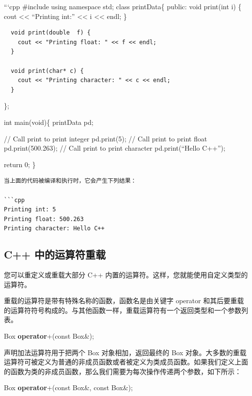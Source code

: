 \documentclass[
]{article}
\newenvironment{Shaded}{}{}
\newcommand{\AttributeTok}[1]{\textcolor[rgb]{0.49,0.56,0.16}{#1}}
\newcommand{\KeywordTok}[1]{\textcolor[rgb]{0.00,0.44,0.13}{\textbf{#1}}}
\newcommand{\NormalTok}[1]{#1}
\newcommand{\OperatorTok}[1]{\textcolor[rgb]{0.40,0.40,0.40}{#1}}
\begin{document}
\hspace{0pt}```cpp \#include using namespace std; class printData\{
public: void print(int i) \{ cout \textless\textless{} ``Printing int:''
\textless\textless{} i \textless\textless{} endl; \}

\begin{verbatim}
  void print(double  f) {
    cout << "Printing float: " << f << endl;
  }

  void print(char* c) {
    cout << "Printing character: " << c << endl;
  }
\end{verbatim}

\};

int main(void)\{ printData pd;

// Call print to print integer pd.print(5); // Call print to print float
pd.print(500.263); // Call print to print character pd.print(``Hello
C++'');

return 0; \}

\begin{verbatim}
当上面的代码被编译和执行时，它会产生下列结果：

```cpp
Printing int: 5
Printing float: 500.263
Printing character: Hello C++
\end{verbatim}

\hypertarget{c-ux4e2dux7684ux8fd0ux7b97ux7b26ux91cdux8f7d}{%
\subsection{C++
中的运算符重载}\label{c-ux4e2dux7684ux8fd0ux7b97ux7b26ux91cdux8f7d}}

您可以重定义或重载大部分 C++
内置的运算符。这样，您就能使用自定义类型的运算符。

重载的运算符是带有特殊名称的函数，函数名是由关键字 operator
和其后要重载的运算符符号构成的。与其他函数一样，重载运算符有一个返回类型和一个参数列表。

\begin{Shaded}
\begin{Highlighting}[]
\NormalTok{Box }\KeywordTok{operator}\OperatorTok{+(}\AttributeTok{const}\NormalTok{ Box}\OperatorTok{\&);}
\end{Highlighting}
\end{Shaded}

声明加法运算符用于把两个 Box 对象相加，返回最终的 Box
对象。大多数的重载运算符可被定义为普通的非成员函数或者被定义为类成员函数。如果我们定义上面的函数为类的非成员函数，那么我们需要为每次操作传递两个参数，如下所示：

\begin{Shaded}
\begin{Highlighting}[]
\NormalTok{Box }\KeywordTok{operator}\OperatorTok{+(}\AttributeTok{const}\NormalTok{ Box}\OperatorTok{\&,} \AttributeTok{const}\NormalTok{ Box}\OperatorTok{\&);}
\end{Highlighting}
\end{Shaded}
\end{document}
